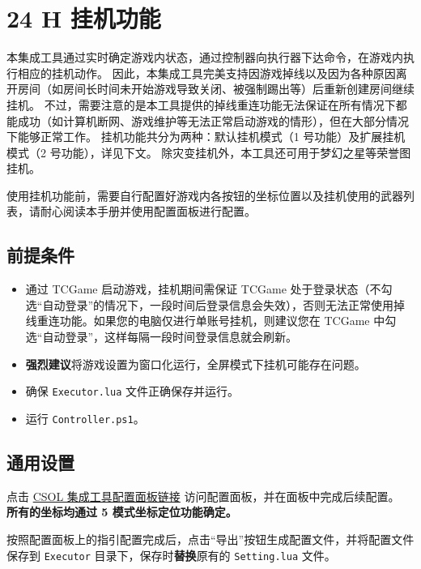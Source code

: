 \section{24 H 挂机功能}

本集成工具通过实时确定游戏内状态，通过控制器向执行器下达命令，在游戏内执行相应的挂机动作。
因此，本集成工具完美支持因游戏掉线以及因为各种原因离开房间（如房间长时间未开始游戏导致关闭、被强制踢出等）后重新创建房间继续挂机。
不过，需要注意的是本工具提供的掉线重连功能无法保证在所有情况下都能成功（如计算机断网、游戏维护等无法正常启动游戏的情形），但在大部分情况下能够正常工作。
挂机功能共分为两种：默认挂机模式（1 号功能）及扩展挂机模式（2 号功能），详见下文。
除灾变挂机外，本工具还可用于梦幻之星等荣誉图挂机。

使用挂机功能前，需要自行配置好游戏内各按钮的坐标位置以及挂机使用的武器列表，请耐心阅读本手册并使用配置面板进行配置。

\subsection{前提条件}

\begin{itemize}

\item 通过 TCGame 启动游戏，挂机期间需保证 TCGame 处于登录状态（不勾选“自动登录”的情况下，一段时间后登录信息会失效），否则无法正常使用掉线重连功能。如果您的电脑仅进行单账号挂机，则建议您在 TCGame 中勾选“自动登录”，这样每隔一段时间登录信息就会刷新。

\item \textbf{\color{red}强烈建议}将游戏设置为窗口化运行，全屏模式下挂机可能存在问题。

\item 确保 \lstinline{Executor.lua} 文件正确保存并运行。

\item 运行 \lstinline{Controller.ps1}。

\end{itemize}

\subsection{通用设置}

点击 \href{https://www.macrohard.fun/CSOL-Utilities/panel}{CSOL 集成工具配置面板链接} 访问配置面板，并在面板中完成后续配置。
\textbf{\color{red}所有的坐标均通过 5 模式坐标定位功能确定。}

按照配置面板上的指引配置完成后，点击“导出”按钮生成配置文件，并将配置文件保存到 \lstinline{Executor} 目录下，保存时\textbf{\color{red}替换}原有的 \lstinline{Setting.lua} 文件。

